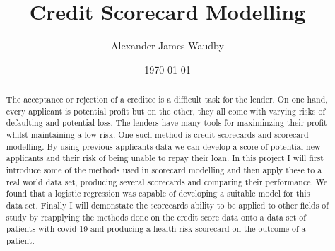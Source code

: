 

\author{Alexander James Waudby}
\title{Credit Scorecard Modelling}
\date{\today}



\maketitle

\begin{abstract}
The acceptance or rejection of a creditee is a difficult task for the lender. On one hand, every applicant is potential profit but on the other, they all come with varying risks of defaulting and potential loss. The lenders have many tools for maximinzing their profit whilst maintaining a low risk. One such method is credit scorecards and scorecard modelling. By using previous applicants data we can develop a score of potential new applicants and their risk of being unable to repay their loan. In this project I will first introduce some of the methods used in scorecard modelling and then apply these to a real world data set, producing several scorecards and comparing their performance. We found that a logistic regression was capable of developing a suitable model for this data set. Finally I will demonstate the scorecards ability to be applied to other fields of study by reapplying the methods done on the credit score data onto a data set of patients with covid-19 and producing a health risk scorecard on the outcome of a patient.
\end{abstract}
\restoregeometry

\tableofcontents

\listoffigures















\printbibliography

